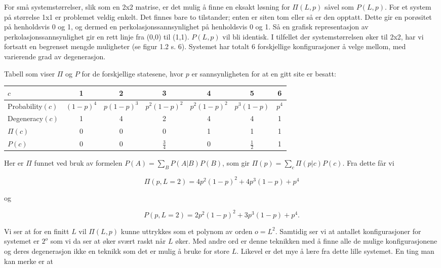 \documentclass[a4paper,10pt]{article}
\begin{document}
For små systemstørrelser, slik som en 2x2 matrise, er det mulig å finne en eksakt løsning for $\Pi(L,p)$ såvel som $P(L,p)$. For et system på størrelse 1x1 er problemet veldig enkelt. Det finnes bare to tilstander; enten er siten tom eller så er den opptatt. Dette gir en porøsitet på henholdsvis 0 og 1, og dermed en perkolasjonssannsynlighet på henholdsvis 0 og 1. Så en grafisk representasjon av perkolasjonssannsynlighet gir en rett linje fra (0,0) til (1,1). $P(L,p)$ vil bli identisk. I tilfellet der systemstørrelsen øker til 2x2, har vi fortsatt en begrenset mengde muligheter (se figur 1.2 s. 6). Systemet har totalt 6 forskjellige konfigurasjoner å velge mellom, med varierende grad av degenerasjon. 

Tabell som viser $\Pi$ og $P$ for de forskjellige statesene, hvor $p$ er sannsynligheten for at en gitt site er besatt:

\begin{center}
  \begin{tabular}{| l | c | c | c | c | c | c | }
    \hline
    $c$        & 1 & 2 & 3 & 4 & 5 & 6 \\ \hline
    Probability$(c)$     & $(1-p)^4$ & $p(1-p)^3$ & $p^2(1-p)^2$ & $p^2(1-p)^2$ & $p^3(1-p)$ & $p^4$ \\ \hline
    Degeneracy$(c)$ & 1 & 4 & 2 & 4 & 4 & 1 \\ \hline
    $\Pi(c)$   & 0 & 0 & 0 & 1 & 1 & 1 \\ \hline
    $P(c)$     & 0 & 0 & $\frac{3}{4}$ & 0 & $\frac{1}{2}$ & 1 \\
    \hline
  \end{tabular}
\end{center}

Her er $\Pi$ funnet ved bruk av formelen $P(A) = \sum_B P(A|B)P(B)$, som gir $\Pi(p) = \sum_c \Pi(p|c)P(c)$. Fra dette får vi

\begin{equation}
 \Pi(p,L=2) = 4p^2(1-p)^2 + 4p^3(1-p) +p^4
\end{equation}

og 

\begin{equation}
 P(p,L=2) = 2p^2(1-p)^2 + 3p^3(1-p) + p^4. 
\end{equation}

Vi ser at for en finitt $L$ vil $\Pi(L,p)$ kunne uttrykkes som et polynom av orden $o = L^2$. Samtidig ser vi at antallet konfigurasjoner for systemet er $2^o$ som vi da ser at øker svært raskt når $L$ øker. Med andre ord er denne teknikken med å finne alle de mulige konfigurasjonene og deres degenerasjon ikke en teknikk som det er mulig å bruke for store $L$. Likevel er det mye å lære fra dette lille systemet. En ting man kan merke er at
\end{document}
